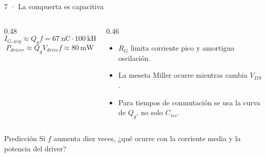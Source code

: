 \documentclass[aspectratio=169]{beamer}
\begin{document}
\begin{frame}{7 · La compuerta es capacitiva}
  \begin{columns}[T]
    \begin{column}{0.48\textwidth}
      \[
        I_{G,avg}\approx Q_g f
        =\SI{67}{\nano\coulomb}\cdot\SI{100}{\kilo\hertz}
        =\SI{6.7}{\milli\ampere}
      \]
      \[
        P_{driver}\approx Q_g V_{drive}f\approx\SI{80}{\milli\watt}
      \]
    \end{column}
    \begin{column}{0.46\textwidth}
      \begin{itemize}
        \item $R_G$ limita corriente pico y amortigua oscilación.
        \item La meseta Miller ocurre mientras cambia $V_{DS}$.
        \item Para tiempos de conmutación se usa la curva de $Q_g$, no solo
          $C_{iss}$.
      \end{itemize}
    \end{column}
  \end{columns}
  \begin{block}{Predicción}
    Si $f$ aumenta diez veces, ¿qué ocurre con la corriente media y la potencia
    del driver?
  \end{block}
\end{frame}
\end{document}

